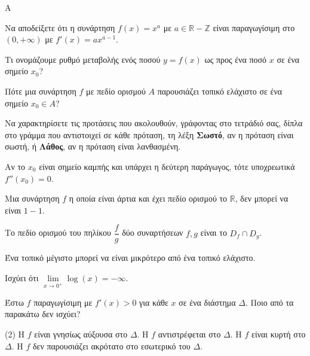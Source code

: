 \begin{thema}{A}
\begin{erwthma}
    \item Να αποδείξετε ότι η συνάρτηση $ f(x)=x^a $ με $ a\in\mathbb{R}-\mathbb{Z} $ είναι παραγωγίσιμη στο $ (0,+\infty) $ με $ f'(x)=ax^{a-1} $.
    \item Τι ονομάζουμε ρυθμό μεταβολής ενός ποσού $y=f(x)$ ως προς ένα ποσό $x$ σε ένα σημείο $x_0$?
    \item Πότε μια συνάρτηση $f$ με πεδίο ορισμού $A$ παρουσιάζει τοπικό ελάχιστο σε ένα σημείο $x_0\in A$?
    \item Να χαρακτηρίσετε τις προτάσεις που ακολουθούν, γράφοντας στο τετράδιό σας, δίπλα στο γράμμα που αντιστοιχεί σε κάθε πρόταση, τη λέξη \textbf{Σωστό}, αν η πρόταση είναι σωστή, ή \textbf{Λάθος}, αν η πρόταση είναι λανθασμένη.
    \begin{alist}
        \item Αν το $x_0$ είναι σημείο καμπής και υπάρχει η δεύτερη παράγωγος, τότε υποχρεωτικά $f''(x_0) = 0$.
        \item Μια συνάρτηση $f$ η οποία είναι άρτια και έχει πεδίο ορισμού το $\mathbb{R}$, δεν μπορεί να είναι $1-1$.
        \item Το πεδίο ορισμού του πηλίκου $\dfrac{f}{g}$ δύο συναρτήσεων $f,g$ είναι το $D_f\cap D_g$.
        \item Ένα τοπικό μέγιστο μπορεί να είναι μικρότερο από ένα τοπικό ελάχιστο.
        \item Ισχύει ότι $\lim\limits_{x\to0^+}\log(x)=-\infty$.
    \end{alist}
    \item Έστω $f$ παραγωγίσιμη με $f'(x) > 0$ για κάθε $x$ σε ένα διάστημα $\Delta$. Ποιο από τα παρακάτω δεν ισχύει?
    \begin{tasks}[label=\let\textdexiakeraia\relax\alph*.](2)
        \task Η $f$ είναι γνησίως αύξουσα στο $\Delta$.
        \task Η $f$ αντιστρέφεται στο $\Delta$.
        \task Η $f$ είναι κυρτή στο $\Delta$.
        \task Η $f$ δεν παρουσιάζει ακρότατο στο εσωτερικό του $\Delta$.
    \end{tasks}
\end{erwthma}
\end{thema}


